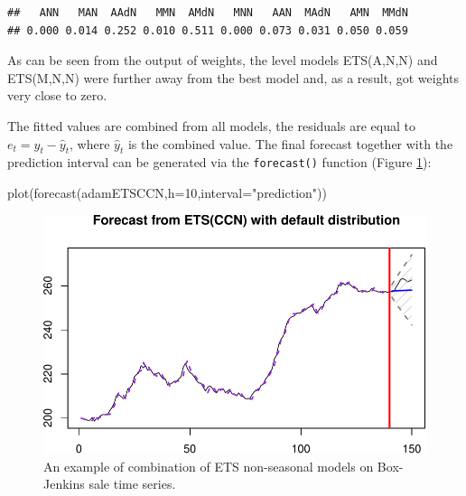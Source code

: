 \documentclass[
]{book}
\newenvironment{Shaded}{\begin{snugshade}}{\end{snugshade}}
\newcommand{\AttributeTok}[1]{\textcolor[rgb]{0.77,0.63,0.00}{#1}}
\newcommand{\DecValTok}[1]{\textcolor[rgb]{0.00,0.00,0.81}{#1}}
\newcommand{\FunctionTok}[1]{\textcolor[rgb]{0.00,0.00,0.00}{#1}}
\newcommand{\NormalTok}[1]{#1}
\newcommand{\SpecialCharTok}[1]{\textcolor[rgb]{0.00,0.00,0.00}{#1}}
\newcommand{\StringTok}[1]{\textcolor[rgb]{0.31,0.60,0.02}{#1}}
\theoremstyle{definition}
\theoremstyle{definition}
\theoremstyle{definition}
\theoremstyle{definition}
\theoremstyle{remark}
\begin{document}
\begin{Shaded}
\end{Shaded}

\begin{verbatim}
##   ANN   MAN  AAdN   MMN  AMdN   MNN   AAN  MAdN   AMN  MMdN 
## 0.000 0.014 0.252 0.010 0.511 0.000 0.073 0.031 0.050 0.059
\end{verbatim}

As can be seen from the output of weights, the level models ETS(A,N,N) and ETS(M,N,N) were further away from the best model and, as a result, got weights very close to zero.

The fitted values are combined from all models, the residuals are equal to \(e_t = y_t -\hat{y}_t\), where \(\hat{y}_t\) is the combined value. The final forecast together with the prediction interval can be generated via the \texttt{forecast()} function (Figure \ref{fig:adamETSCCN}):

\begin{Shaded}
\begin{Highlighting}[]
\FunctionTok{plot}\NormalTok{(}\FunctionTok{forecast}\NormalTok{(adamETSCCN,}\AttributeTok{h=}\DecValTok{10}\NormalTok{,}\AttributeTok{interval=}\StringTok{"prediction"}\NormalTok{))}
\end{Highlighting}
\end{Shaded}

\begin{figure}
\centering
\includegraphics{Svetunkov--2022----ADAM_files/figure-latex/adamETSCCN-1.pdf}
\caption{\label{fig:adamETSCCN}An example of combination of ETS non-seasonal models on Box-Jenkins sale time series.}
\end{figure}
\end{document}

